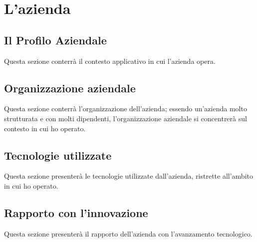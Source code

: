 

\chapter{L'azienda}
\label{cap:azienda}

\section{Il Profilo Aziendale}
\label{sec:il_profilo_aziendale}
Questa sezione conterrà il contesto applicativo in cui l'azienda opera.

\section{Organizzazione aziendale}
\label{sec:organizzazione_aziendale}
Questa sezione conterrà l'organizzazione dell'azienda; essendo un'azienda molto strutturata e con molti dipendenti, l'organizzazione aziendale si concentrerà sul contesto in cui ho operato.

\section{Tecnologie utilizzate}
\label{sec:tecnologie_utilizzate}
Questa sezione presenterà le tecnologie utilizzate dall'azienda, ristrette all'ambito in cui ho operato.

\section{Rapporto con l'innovazione}
\label{sec:rapporto_con_innovazione}
Questa sezione presenterà il rapporto dell'azienda con l'avanzamento tecnologico.
